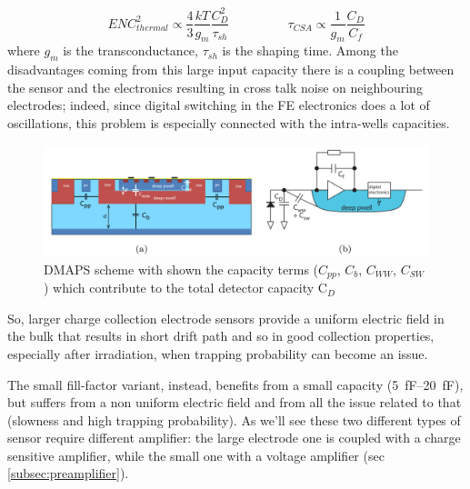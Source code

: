       \begin{equation}
         ENC^2 _ {thermal} \propto \frac{4}{3}\frac{kT}{g_m}\frac{C_D ^2}{\tau_{sh}}
         \hspace{55pt}
         \tau_{CSA} \propto \frac{1}{g_m}\frac{C_D}{C_f}
      \end{equation}
      where $g_m$ is the transconductance, $\tau_{sh}$ is the shaping time. 
      Among the disadvantages coming from this large input capacity there is a coupling between the sensor and the electronics resulting in cross talk noise on neighbouring electrodes; indeed, since digital switching in the FE electronics does a lot of oscillations, this problem is especially connected with the intra-wells capacities.
      \begin{figure}[h!]
         \centering\includegraphics[width=12cm]{figures/Pixel_detectors/DMAPS_capacity.png}
         \caption{DMAPS scheme with shown the capacity terms ($C_{pp}$, $C_{b}$, $C_{WW}$, $C_{SW}$) which contribute to the total detector capacity C$_{D}$}
         \label{fig:DMAPS_capacity}
      \end{figure}
      So, larger charge collection electrode sensors provide a uniform electric field in the bulk that results in short drift path and so in good collection properties, especially after irradiation, when trapping probability can become an issue.

      The small fill-factor variant, instead, benefits from a small capacity (\SIrange{5}{20}{fF}), but suffers from a non uniform electric field and from all the issue related to that (slowness and high trapping probability). 
      As we'll see these two different types of sensor require different amplifier: the large electrode one is coupled with a charge sensitive amplifier, while the small one with a voltage amplifier (sec \ref{subsec:preamplifier}).

